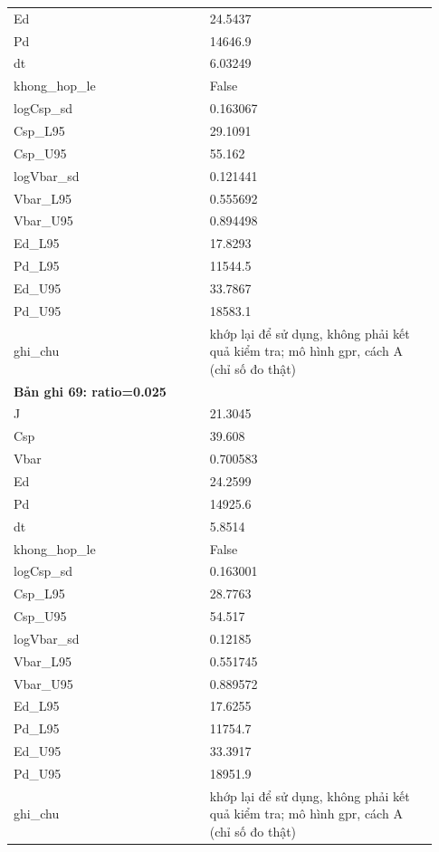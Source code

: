 \begin{longtable}{p{0.43\linewidth}p{0.50\linewidth}}
Ed & 24.5437 \\
Pd & 14646.9 \\
dt & 6.03249 \\
khong\_\allowbreak hop\_\allowbreak le & False \\
logCsp\_\allowbreak sd & 0.163067 \\
Csp\_\allowbreak L95 & 29.1091 \\
Csp\_\allowbreak U95 & 55.162 \\
logVbar\_\allowbreak sd & 0.121441 \\
Vbar\_\allowbreak L95 & 0.555692 \\
Vbar\_\allowbreak U95 & 0.894498 \\
Ed\_\allowbreak L95 & 17.8293 \\
Pd\_\allowbreak L95 & 11544.5 \\
Ed\_\allowbreak U95 & 33.7867 \\
Pd\_\allowbreak U95 & 18583.1 \\
ghi\_\allowbreak chu & khớp lại để sử dụng, không phải kết quả kiểm tra; mô hình gpr, cách A (chỉ số đo thật) \\
\midrule
\multicolumn{2}{p{0.95\linewidth}}{\textbf{Bản ghi 69: ratio=0.025}} \\
J & 21.3045 \\
Csp & 39.608 \\
Vbar & 0.700583 \\
Ed & 24.2599 \\
Pd & 14925.6 \\
dt & 5.8514 \\
khong\_\allowbreak hop\_\allowbreak le & False \\
logCsp\_\allowbreak sd & 0.163001 \\
Csp\_\allowbreak L95 & 28.7763 \\
Csp\_\allowbreak U95 & 54.517 \\
logVbar\_\allowbreak sd & 0.12185 \\
Vbar\_\allowbreak L95 & 0.551745 \\
Vbar\_\allowbreak U95 & 0.889572 \\
Ed\_\allowbreak L95 & 17.6255 \\
Pd\_\allowbreak L95 & 11754.7 \\
Ed\_\allowbreak U95 & 33.3917 \\
Pd\_\allowbreak U95 & 18951.9 \\
ghi\_\allowbreak chu & khớp lại để sử dụng, không phải kết quả kiểm tra; mô hình gpr, cách A (chỉ số đo thật) \\

\end{longtable}
